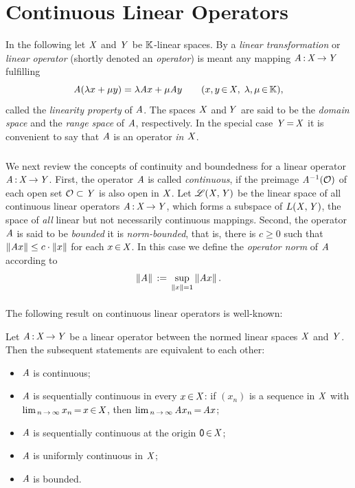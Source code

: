 \documentclass[11pt,twoside]{article}
\begin{document}
\section{Continuous Linear Operators}
In the following let $\mathit{X}$ and $\mathit{Y}$ be ${\mathbb{K}}$-linear spaces.
By a \textit{linear trans\-formation} or \textit{linear operator}
(shortly denoted an \textit{operator})
is meant any mapping $ \mathit{A} {\,:\,} \mathit{X} {\,\to\,} \mathit{Y}$ fulfilling
\[
\mathit{A}(\lambda x + \mu y) = \lambda \mathit{A} x + \mu \mathit{A} y
\quad \quad (x,y {\,\in\,} \mathit{X}, \; \lambda,\mu {\,\in\,} {\mathbb{K}}),
\]
called the \textit{linearity property} of $\mathit{A}$.
The spaces $\mathit{X}$ and\,$\mathit{Y}$ are said to be the \textit{domain space}
and the \textit{range space} of $\mathit{A}$,
respectively.
In the special case $\mathit{Y} {\,=\,} \mathit{X}$
it is convenient to say that $\mathit{A}$ is an operator \textit{in $\mathit{X}$}.

\subparagraph{}
We next review the concepts of continuity and boundedness
for a linear operator $\mathit{A} {\,:\,} \mathit{X} {\,\to\,} \mathit{Y}$.
First,
the operator $\mathit{A}$ is called \textit{continuous},
if the preimage $\mathit{A}^{-1}(\mathcal{O})$ of each open set $\mathcal{O} \subset \mathit{Y}$
is also open in $\mathit{X}$.
Let $\mathscr{L}(\mathit{X},\mathit{Y})$ be the linear space
of all continuous linear operators $\mathit{A} {\,:\,} \mathit{X} {\,\to\,} \mathit{Y}$,
which forms a subspace of $L(\mathit{X},\mathit{Y})$,
the space of \textit{all} linear but not necessarily continuous mappings.
Second,
the operator $\mathit{A}$ is said to be \textit{bounded}
\iff it is \textit{norm-bounded},
that is,
there is $c \geq 0$
such that $\left\lVert \mathit{A} x \right\rVert \leq c \cdot \left\lVert x \right\rVert$ for each $x {\,\in\,} \mathit{X}$.
In this case we define the \textit{operator norm} of $\mathit{A}$ according to
\begin{equation}\label{OPERATOR_NORM}
\left\lVert \mathit{A} \right\rVert \,:=\, \sup_{\left\lVert x \right\rVert=1} \left\lVert \mathit{A} x \right\rVert.
\end{equation}

\paragraph{}
The following result on continuous linear operators is well-known:

\begin{theorem}
Let $\mathit{A} {\,:\,} \mathit{X} {\,\to\,} \mathit{Y}$ be a linear operator
between the normed linear spaces $\mathit{X}$ and $\mathit{Y}$.
Then the subsequent statements are equivalent to each other:

\begin{itemize}[leftmargin=15pt]
\item[(a)] $\mathit{A}$ is continuous;
\item[(b)] $\mathit{A}$ is sequentially continuous in every $x {\,\in\,} \mathit{X}$:
           if $(x_n)$ is a sequence in $\mathit{X}$
           with $\lim_{\,n {\,\to\,} \infty} x_n {\,=\,} x {\,\in\,} \mathit{X}$,
           then $\lim_{\,n {\,\to\,} \infty} \mathit{A} x_n {\,=\,} \mathit{A} x$;
\item[(c)] $\mathit{A}$ is sequentially continuous at the origin ${\mathsf{0}} {\,\in\,} \mathit{X}$;
\item[(d)] $\mathit{A}$ is uniformly continuous in $\mathit{X}$;
\item[(e)] $\mathit{A}$ is bounded.
\end{itemize}
\end{theorem}
\end{document}
